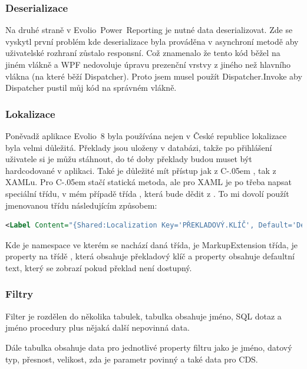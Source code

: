 \documentclass[czech,bachelor,dept460,male,csharp]{diploma}
\newcommand{\EvolioEight}{Evolio~8}
\newcommand{\EFilters}{Evolio~Power~Reporting}
\newcommand{\Csharp}{%
  {\settoheight{\dimen0}{C}C\kern-.05em \resizebox{!}{\dimen0}{\raisebox{\depth}{\#}}}}
\begin{document}
		\subsubsection{Deserializace}
			 Na druhé straně v {\EFilters} je nutné data deserializovat. Zde se vyskytl první problém kde deserializace byla prováděna v asynchroní metodě aby uživatelské rozhraní zůstalo responsní. Což znamenalo že tento kód běžel na jiném vlákně a WPF nedovoluje úpravu prezenční vrstvy z jiného než hlavního vlákna (na které běží Dispatcher). Proto jsem musel použít Dispatcher.Invoke aby Dispatcher pustil můj kód na správném vlákně.

			 

		\subsubsection{Lokalizace}
			Poněvadž aplikace {\EvolioEight} byla používána nejen v České republice lokalizace byla velmi důležitá. Překlady jsou uloženy v databázi, takže po přihlášení uživatele si je můžu stáhnout, do té doby překlady budou muset být hardcodované v aplikaci. Také je důležité mít přístup jak z {\Csharp}, tak z XAMLu. Pro {\Csharp} stačí statická metoda, ale pro XAML je po třeba napsat speciální třídu, v mém případě třída , která bude dědit z . To mi dovolí použít jmenovanou třídu následujícím způsobem:
			\begin{lstlisting}[language=XML,caption={MarkupExtension příkad},label=MarkupExtension]
<Label Content="{Shared:Localization Key='PŘEKLADOVÝ.KLÍČ', Default='Defaultní text'}"/>
			\end{lstlisting}
			 Kde  je namespace ve kterém se nachází daná třída,  je MarkupExtension třída,  je property na třídě , která obsahuje překladový klíč a property  obsahuje defaultní text, který se zobrazí pokud překlad není dostupný.
		\subsubsection{Filtry}
			Filter je rozdělen do několika tabulek, tabulka  obsahuje jméno, SQL dotaz a jméno procedury plus nějaká další nepovinná data. 
			
			Dále tabulka  obsahuje data pro jednotlivé property filtru jako je jméno, datový typ, přesnost, velikost, zda je parametr povinný a také data pro CDS. 
			
\end{document}
